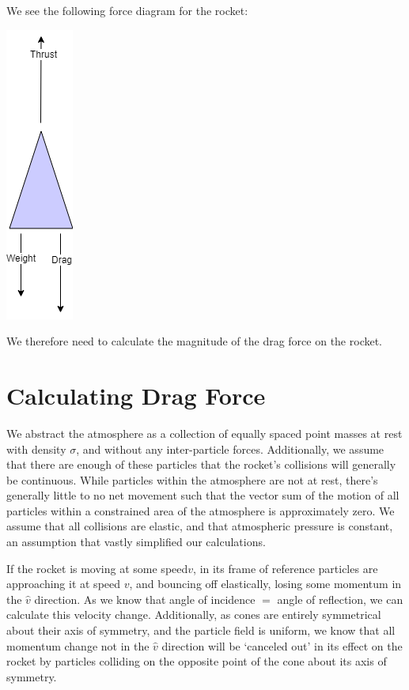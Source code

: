 \documentclass[]{article}
\begin{document}
We see the following force diagram for the rocket:

\begin{center}
	\includegraphics[scale=0.5]{forces.png}
\end{center}


We therefore need to calculate the magnitude of the drag force on the rocket.


\section{Calculating Drag Force}

We abstract the atmosphere as a collection of equally spaced point masses at rest with density $\sigma$, and without any inter-particle forces. Additionally, we assume that there are enough of these particles that the rocket's collisions will generally be continuous. While particles within the atmosphere are not at rest, there's generally little to no net movement such that the vector sum of the motion of all particles within a constrained area of the atmosphere is approximately zero. We assume that all collisions are elastic, and that atmospheric pressure is constant, an assumption that vastly simplified our calculations.

If the rocket is moving at some speed$v$, in its frame of reference particles are approaching it at speed $v$, and bouncing off elastically, losing some momentum in the $\hat{v}$ direction. As we know that angle of incidence $=$ angle of reflection, we can calculate this velocity change. Additionally, as cones are entirely symmetrical about their axis of symmetry, and the particle field is uniform, we know that all momentum change not in the $\hat{v}$ direction will be `canceled out' in its effect on the rocket by particles colliding on the opposite point of the cone about its axis of symmetry.
\end{document}
